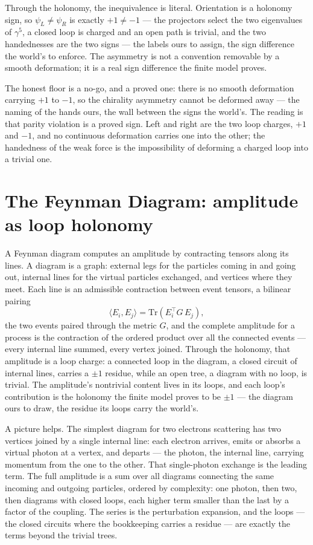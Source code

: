 Through the holonomy, the inequivalence is literal. Orientation is a holonomy sign, so $\psi_L \neq
\psi_R$ is exactly $+1 \neq -1$ --- the projectors select the two eigenvalues of $\gamma^5$, a closed loop is
charged and an open path is trivial, and the two handednesses are the two signs --- the labels ours to assign, the sign difference the world's to
enforce. The asymmetry is not a
convention removable by a smooth deformation; it is a real sign difference the finite model proves.

The honest floor is a no-go, and a proved one: there is no smooth deformation carrying $+1$ to $-1$, so the
chirality asymmetry cannot be deformed away --- the naming of the hands ours, the wall between the signs the
world's. The reading is that parity violation is a proved sign. Left and
right are the two loop charges, $+1$ and $-1$, and no continuous deformation carries one into the other; the
handedness of the weak force is the impossibility of deforming a charged loop into a trivial one.

\section{The Feynman Diagram: amplitude as loop holonomy}
\label{se:feynman}

A Feynman diagram computes an amplitude by contracting tensors along its lines. A diagram is a graph: external
legs for the particles coming in and going out, internal lines for the virtual particles exchanged, and
vertices where they meet. Each line is an admissible contraction between event tensors, a bilinear pairing
\begin{equation}
  \langle E_i, E_j \rangle = \mathrm{Tr}\!\left(E_i^\top G\, E_j\right),
\end{equation}
the two events paired through the metric $G$, and the complete amplitude for a process is the contraction of
the ordered product over all the connected events --- every internal line summed, every vertex joined. Through the holonomy, that amplitude is a loop charge: a connected loop in the diagram, a closed circuit of
internal lines, carries a $\pm 1$ residue, while an open tree, a diagram with no loop, is trivial. The
amplitude's nontrivial content lives in its loops, and each loop's contribution is the holonomy the finite
model proves to be $\pm 1$ --- the diagram ours to draw, the residue its loops carry the world's.

A picture helps. The simplest diagram for two electrons scattering has two vertices joined by a single
internal line: each electron arrives, emits or absorbs a virtual photon at a vertex, and departs --- the
photon, the internal line, carrying momentum from the one to the other. That single-photon exchange is the
leading term. The full amplitude is a sum over all diagrams connecting the same incoming and outgoing
particles, ordered by complexity: one photon, then two, then diagrams with closed loops, each higher term
smaller than the last by a factor of the coupling. The series is the perturbation expansion, and the loops ---
the closed circuits where the bookkeeping carries a residue --- are exactly the terms beyond the trivial
trees.


